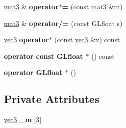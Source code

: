 \begin{DoxyCompactItemize}
\item 
\hypertarget{class_angel_1_1mat3_ace9e4a45d3dc4ad3d6d05474159e75f9}{\hyperlink{class_angel_1_1mat3}{mat3} \& {\bfseries operator$\ast$=} (const \hyperlink{class_angel_1_1mat3}{mat3} \&m)}\label{class_angel_1_1mat3_ace9e4a45d3dc4ad3d6d05474159e75f9}

\item 
\hypertarget{class_angel_1_1mat3_a72b528f838b9a7c25daeda95c2e54431}{\hyperlink{class_angel_1_1mat3}{mat3} \& {\bfseries operator/=} (const \-G\-Lfloat s)}\label{class_angel_1_1mat3_a72b528f838b9a7c25daeda95c2e54431}

\item 
\hypertarget{class_angel_1_1mat3_a816f9f6ba6cbebea56b0f84432643e4a}{\hyperlink{struct_angel_1_1vec3}{vec3} {\bfseries operator$\ast$} (const \hyperlink{struct_angel_1_1vec3}{vec3} \&v) const }\label{class_angel_1_1mat3_a816f9f6ba6cbebea56b0f84432643e4a}

\item 
\hypertarget{class_angel_1_1mat3_a1d8dde0ed668c30af292f9b53253dec9}{{\bfseries operator const G\-Lfloat $\ast$} () const }\label{class_angel_1_1mat3_a1d8dde0ed668c30af292f9b53253dec9}

\item 
\hypertarget{class_angel_1_1mat3_a5b68f66855c70b79a86a3ddc65acda6f}{{\bfseries operator G\-Lfloat $\ast$} ()}\label{class_angel_1_1mat3_a5b68f66855c70b79a86a3ddc65acda6f}

\end{DoxyCompactItemize}
\subsection*{\-Private \-Attributes}
\begin{DoxyCompactItemize}
\item 
\hypertarget{class_angel_1_1mat3_a937bb5305c6e023812a87d0a329546b0}{\hyperlink{struct_angel_1_1vec3}{vec3} {\bfseries \-\_\-m} \mbox{[}3\mbox{]}}\label{class_angel_1_1mat3_a937bb5305c6e023812a87d0a329546b0}

\end{DoxyCompactItemize}
